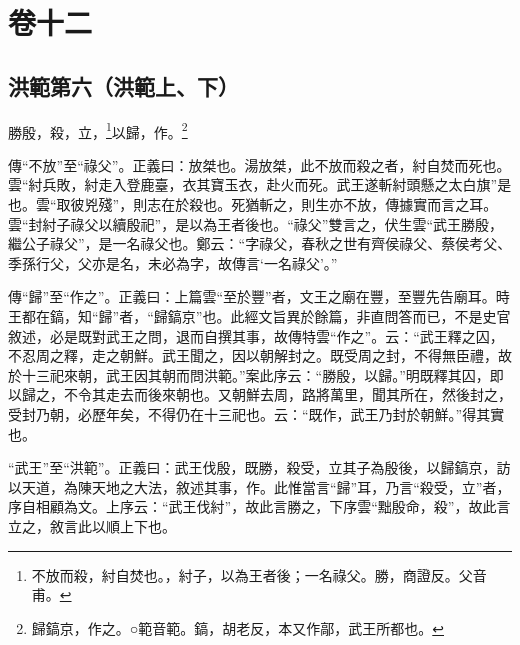 

\chapter{卷十二}


\section{洪範第六（洪範上、下）}


勝殷，殺，立，\footnote{不放而殺，紂自焚也。，紂子，以為王者後；一名祿父。勝，商證反。父音甫。}以歸，作。\footnote{歸鎬京，作之。○範音範。鎬，胡老反，本又作鄗，武王所都也。}

{\noindent\zhuan{}\fzbyks 傳“不放”至“祿父”。正義曰：放桀也。湯放桀，此不放而殺之者，紂自焚而死也。雲“紂兵敗，紂走入登鹿臺，衣其寶玉衣，赴火而死。武王遂斬紂頭懸之太白旗”是也。雲“取彼兇殘”，則志在於殺也。死猶斬之，則生亦不放，傳據實而言之耳。雲“封紂子祿父以續殷祀”，是以為王者後也。“祿父”雙言之，伏生雲“武王勝殷，繼公子祿父”，是一名祿父也。鄭云：“字祿父，春秋之世有齊侯祿父、蔡侯考父、季孫行父，父亦是名，未必為字，故傳言‘一名祿父’。” \par}

{\noindent\zhuan{}\fzbyks 傳“歸”至“作之”。正義曰：上篇雲“至於豐”者，文王之廟在豐，至豐先告廟耳。時王都在鎬，知“歸”者，“歸鎬京”也。此經文旨異於餘篇，非直問答而已，不是史官敘述，必是既對武王之問，退而自撰其事，故傳特雲“作之”。云：“武王釋之囚，不忍周之釋，走之朝鮮。武王聞之，因以朝解封之。既受周之封，不得無臣禮，故於十三祀來朝，武王因其朝而問洪範。”案此序云：“勝殷，以歸。”明既釋其囚，即以歸之，不令其走去而後來朝也。又朝鮮去周，路將萬里，聞其所在，然後封之，受封乃朝，必歷年矣，不得仍在十三祀也。云：“既作，武王乃封於朝鮮。”得其實也。 \par}

{\noindent\shu{}\fzkt “武王”至“洪範”。正義曰：武王伐殷，既勝，殺受，立其子為殷後，以歸鎬京，訪以天道，為陳天地之大法，敘述其事，作。此惟當言“歸”耳，乃言“殺受，立”者，序自相顧為文。上序云：“武王伐紂”，故此言勝之，下序雲“黜殷命，殺”，故此言立之，敘言此以順上下也。 \par}

